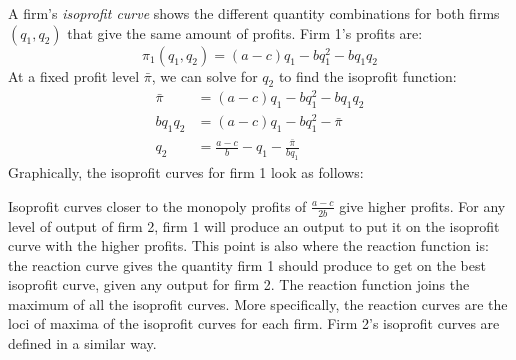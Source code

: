 \documentclass{article}
\begin{document}
A firm's \emph{isoprofit curve} shows the different quantity combinations for both firms $\left( q_1,q_2 \right)$ that give the same amount of profits. Firm 1's profits are:
\[
  \pi_1\left( q_1,q_2 \right)=\left( a-c \right)q_1-bq_1^2 - bq_1q_2
\]
At a fixed profit level $\bar{\pi}$, we can solve for $q_2$ to find the isoprofit function:
\begin{align*}
  \bar{\pi} &= \left( a-c \right)q_1 - bq_1^2 -bq_1q_2 \\
  bq_1 q_2 &= \left( a-c \right)q_1 - bq_1^2 -\bar{\pi} \\
  q_2 &= \frac{a-c}{b}-q_1 - \frac{\bar{\pi}}{bq_1}
\end{align*}
Graphically, the isoprofit curves for firm 1 look as follows:
\begin{center}
\end{center}
Isoprofit curves closer to the monopoly profits of $\frac{a-c}{2b}$ give higher profits. For any level of output of firm 2, firm 1 will produce an output to put it on the isoprofit curve with the higher profits. This point is also where the reaction function is: the reaction curve gives the quantity firm 1 should produce to get on the best isoprofit curve, given any output for firm 2. The reaction function joins the maximum of all the isoprofit curves. More specifically, the reaction curves are the loci of maxima of the isoprofit curves for each firm. Firm 2's isoprofit curves are defined in a similar way.
\end{document}
